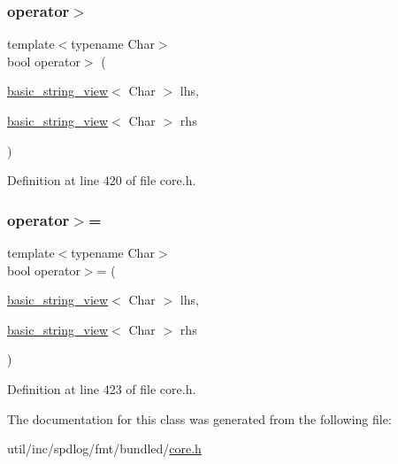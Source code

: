\mbox{\label{classbasic__string__view_a78b8913fe704e33269d9baa6f310b9b8}} 
\subsubsection{\texorpdfstring{operator$>$}{operator>}}
{\footnotesize\ttfamily template$<$typename Char$>$ \\
bool operator$>$ (\begin{DoxyParamCaption}\item[{\hyperlink{classbasic__string__view}{basic\+\_\+string\+\_\+view}$<$ Char $>$}]{lhs,  }\item[{\hyperlink{classbasic__string__view}{basic\+\_\+string\+\_\+view}$<$ Char $>$}]{rhs }\end{DoxyParamCaption})\hspace{0.3cm}{\ttfamily [friend]}}



Definition at line 420 of file core.\+h.

\mbox{\label{classbasic__string__view_a13611d21d36e30193ebaf50463cbe75e}} 
\subsubsection{\texorpdfstring{operator$>$=}{operator>=}}
{\footnotesize\ttfamily template$<$typename Char$>$ \\
bool operator$>$= (\begin{DoxyParamCaption}\item[{\hyperlink{classbasic__string__view}{basic\+\_\+string\+\_\+view}$<$ Char $>$}]{lhs,  }\item[{\hyperlink{classbasic__string__view}{basic\+\_\+string\+\_\+view}$<$ Char $>$}]{rhs }\end{DoxyParamCaption})\hspace{0.3cm}{\ttfamily [friend]}}



Definition at line 423 of file core.\+h.



The documentation for this class was generated from the following file\+:\begin{DoxyCompactItemize}
\item 
util/inc/spdlog/fmt/bundled/\hyperlink{core_8h}{core.\+h}\end{DoxyCompactItemize}
